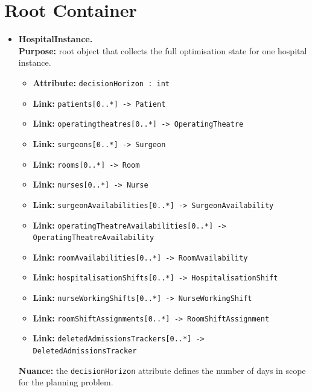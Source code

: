 \documentclass[10pt]{article}
\newcommand{\clabel}[1]{{\large\bfseries #1}}
\begin{document}
\section*{Root Container}
\begin{itemize}
    \item \clabel{HospitalInstance.}\\
    \textbf{Purpose:} root object that collects the full optimisation state for one hospital instance.
    \begin{itemize}
        \item \textbf{Attribute:} \texttt{decisionHorizon : int}
        \item \textbf{Link:} \texttt{patients[0..*] -> Patient}
        \item \textbf{Link:} \texttt{operatingtheatres[0..*] -> OperatingTheatre}
        \item \textbf{Link:} \texttt{surgeons[0..*] -> Surgeon}
        \item \textbf{Link:} \texttt{rooms[0..*] -> Room}
        \item \textbf{Link:} \texttt{nurses[0..*] -> Nurse}
        \item \textbf{Link:} \texttt{surgeonAvailabilities[0..*] -> SurgeonAvailability}
        \item \textbf{Link:} \texttt{operatingTheatreAvailabilities[0..*] -> OperatingTheatreAvailability}
        \item \textbf{Link:} \texttt{roomAvailabilities[0..*] -> RoomAvailability}
        \item \textbf{Link:} \texttt{hospitalisationShifts[0..*] -> HospitalisationShift}
        \item \textbf{Link:} \texttt{nurseWorkingShifts[0..*] -> NurseWorkingShift}
        \item \textbf{Link:} \texttt{roomShiftAssignments[0..*] -> RoomShiftAssignment}
        \item \textbf{Link:} \texttt{deletedAdmissionsTrackers[0..*] -> DeletedAdmissionsTracker}
    \end{itemize}
    \textbf{Nuance:} the \texttt{decisionHorizon} attribute defines the number of days in scope for the planning problem.
\end{itemize}
\end{document}
